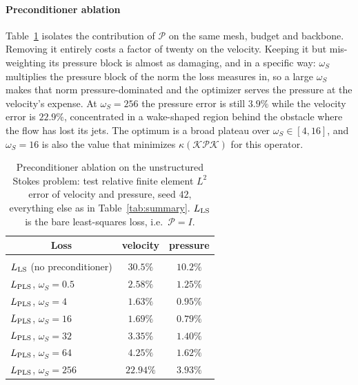 \documentclass{article} %
\begin{document}
\paragraph{Preconditioner ablation} Table~\ref{tab:stokes_ablation} isolates the contribution of $\mathcal P$ on the same mesh, budget and backbone. Removing it entirely costs a factor of twenty on the velocity. Keeping it but mis-weighting its pressure block is almost as damaging, and in a specific way: $\omega_S$ multiplies the pressure block of the norm the loss measures in, so a large $\omega_S$ makes that norm pressure-dominated and the optimizer serves the pressure at the velocity's expense. At $\omega_S = 256$ the pressure error is still $3.9\%$ while the velocity error is $22.9\%$, concentrated in a wake-shaped region behind the obstacle where the flow has lost its jets. The optimum is a broad plateau over $\omega_S \in [4, 16]$, and $\omega_S = 16$ is also the value that minimizes $\kappa(\mathcal K \mathcal P \mathcal K)$ for this operator.

\begin{table}[htb]
   \caption{Preconditioner ablation on the unstructured Stokes problem: test relative finite element $L^2$ error of velocity and pressure, seed $42$, everything else as in Table~\ref{tab:summary}. $L_\textup{LS}$ is the bare least-squares loss, i.e.\ $\mathcal P = I$.}
   \label{tab:stokes_ablation}
   \begin{center}
   \begin{tabular}{lcc}
      \multicolumn{1}{c}{\bf Loss} & \multicolumn{1}{c}{\bf velocity} & \multicolumn{1}{c}{\bf pressure} \\ \hline \\
      $L_\textup{LS}$ (no preconditioner)   & $30.5\%$ & $10.2\%$ \\
      $L_\textup{PLS}$, $\omega_S = 0.5$    & $2.58\%$ & $1.25\%$ \\
      $L_\textup{PLS}$, $\omega_S = 4$      & $1.63\%$ & $0.95\%$ \\
      $L_\textup{PLS}$, $\omega_S = 16$     & $1.69\%$ & $0.79\%$ \\
      $L_\textup{PLS}$, $\omega_S = 32$     & $3.35\%$ & $1.40\%$ \\
      $L_\textup{PLS}$, $\omega_S = 64$     & $4.25\%$ & $1.62\%$ \\
      $L_\textup{PLS}$, $\omega_S = 256$    & $22.94\%$ & $3.93\%$ \\
   \end{tabular}
   \end{center}
\end{table}
\end{document}
